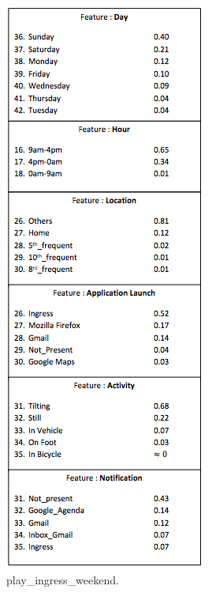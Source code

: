 \begin{figure}[t!]
    \centering
    \begin{subfigure}[t]{0.33\textwidth}
        \centering
        \includegraphics[scale=0.51]{Figures/Ingress.png}
        \caption{play\_ingress\_weekend.}
\label{ing}
    \end{subfigure}%
    \begin{subfigure}[t]{0.33\textwidth}
        \centering

\end{subfigure}
\end{figure}
